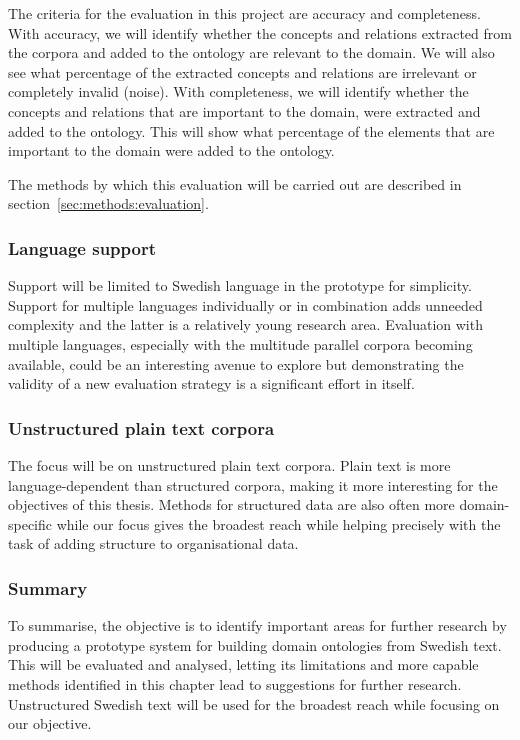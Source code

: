 \documentclass[a4paper]{report}
\begin{document}
The criteria for the evaluation in this project are accuracy and completeness.
With accuracy, we will identify whether the concepts and relations extracted from the corpora and added to the ontology are relevant to the domain.
We will also see what percentage of the extracted concepts and relations are irrelevant or completely invalid (noise).
With completeness, we will identify whether the concepts and relations that are important to the domain, were extracted and added to the ontology.
This will show what percentage of the elements that are important to the domain were added to the ontology.

The methods by which this evaluation will be carried out are described in section~\ref{sec:methods:evaluation}.

\subsubsection{Language support}

Support will be limited to Swedish language in the prototype for simplicity.
Support for multiple languages individually or in combination adds unneeded complexity and the latter is a relatively young research area.
Evaluation with multiple languages, especially with the multitude parallel corpora becoming available, could be an interesting avenue to explore but demonstrating the validity of a new evaluation strategy is a significant effort in itself.

\subsubsection{Unstructured plain text corpora}

The focus will be on unstructured plain text corpora.
Plain text is more language-dependent than structured corpora, making it more interesting for the objectives of this thesis.
Methods for structured data are also often more domain-specific while our focus gives the broadest reach while helping precisely with the task of adding structure to organisational data.

\subsubsection{Summary}

To summarise, the objective is to identify important areas for further research by producing a prototype system for building domain ontologies from Swedish text.
This will be evaluated and analysed, letting its limitations and more capable methods identified in this chapter lead to suggestions for further research.
Unstructured Swedish text will be used for the broadest reach while focusing on our objective.
\end{document}
